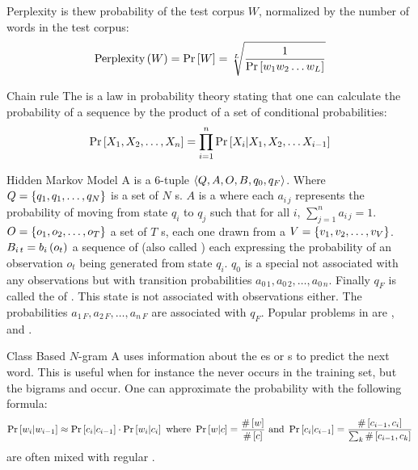 \begin{df}{Perplexity}
\sb{} is thew probability of the test corpus $W$, normalized by the number of words in the test corpus:
\begin{equation}
\mbox{Perplexity}\left(W\right)=\Pr\left[W\right]=\sqrt[L]{\displaystyle\frac{1}{\Pr\left[w_1w_2\ldots w_L\right]}}
\end{equation}
\end{df}
\begin{df}{Chain rule}
The \sb{} is a law in probability theory stating that one can calculate the probability of a sequence by the product of a set of conditional probabilities:
\begin{equation}
\Pr\left[X_1,X_2,\ldots,X_n\right]=\displaystyle\prod_{i=1}^{n}\Pr\left[X_i|X_1,X_2,\ldots X_{i-1}\right]
\end{equation}
\end{df}
\begin{df}{Hidden Markov Model}
A \sb{} is a 6-tuple $\left\langle Q,A,O,B,q_0,q_F\right\rangle$. Where $Q=\left\{q_1,q_1,\ldots,q_N\right\}$ is a set of $N$ s. $A$ is a  where each $a_{i\,j}$ represents the probability of moving from state $q_i$ to $q_j$ such that for all $i$, $\sum_{j=1}^{n}{a_{i\,j}}=1$. $O=\left\{o_1,o_2,\ldots,o_T\right\}$ a set of $T$ s, each one drawn from a  $V=\left\{v_1,v_2,\ldots,v_V\right\}$. $B_{i\,t}=b_i\left(o_t\right)$ a sequence of  (also called ) each expressing the probability of an observation $o_t$ being generated from state $q_i$. $q_0$ is a special  not associated with any observations but with transition probabilities $a_{0\,1},a_{0\,2},\ldots,a_{0\,n}$. Finally $q_F$ is called the  of . This state is not associated with observations either. The probabilities $a_{1\,F},a_{2\,F},\ldots,a_{n\,F}$ are associated with $q_F$. Popular problems in \sb{} are ,  and .
\end{df}
\begin{df}{Class Based $N$-gram}
A \sb{} uses information about the es or s to predict the next word. This is useful when for instance the  never occurs in the training set, but the bigrams  and  occur. One can approximate the probability with the following formula:
\begin{equation}
\Pr\left[w_i|w_{i-1}\right]\approx\Pr\left[c_i|c_{i-1}\right]\cdot\Pr\left[w_i|c_i\right]\mbox{ where }\Pr\left[w|c\right]=\displaystyle\frac{\#\left[w\right]}{\#\left[c\right]}\mbox{ and }\Pr\left[c_i|c_{i-1}\right]=\displaystyle\frac{\#\left[c_{i-1},c_i\right]}{\sum_k\#\left[c_{i-1},c_k\right]}
\end{equation}
\sb{} are often mixed with regular .
\end{df}
